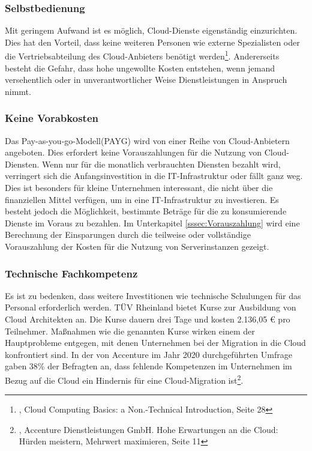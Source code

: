 \subsubsection{Selbstbedienung}
Mit geringem Aufwand ist es möglich, Cloud-Dienste eigenständig einzurichten. Dies hat den Vorteil, dass keine weiteren Personen wie externe Spezialisten oder die Vertriebsabteilung des Cloud-Anbieters  benötigt werden\footnote{\cite{CCB}, Cloud Computing Basics: a Non.-Technical Introduction, Seite 28}.
Andererseits besteht die Gefahr, dass hohe ungewollte Kosten entstehen, wenn jemand versehentlich oder in unverantwortlicher Weise Dienstleistungen in Anspruch nimmt.    

\subsubsection{Keine Vorabkosten}
Das Pay-as-you-go-Modell(PAYG) wird von einer Reihe von Cloud-Anbietern angeboten. Dies erfordert keine Vorauszahlungen für die Nutzung von Cloud-Diensten. Wenn nur für die monatlich verbrauchten Diensten bezahlt wird, verringert sich die Anfangsinvestition in die IT-Infrastruktur oder fällt ganz weg. Dies ist besonders für kleine Unternehmen interessant, die nicht über die finanziellen Mittel verfügen, um in eine IT-Infrastruktur zu investieren. Es besteht jedoch die Möglichkeit, bestimmte Beträge für die zu konsumierende Dienste im Voraus zu bezahlen. Im Unterkapitel \ref{sssec:Vorauszahlung} wird eine Berechnung der Einsparungen durch die teilweise oder vollständige Vorauszahlung der Kosten für die Nutzung von Serverinstanzen gezeigt.  




\subsubsection{Technische Fachkompetenz}
Es ist zu bedenken, dass weitere Investitionen wie technische Schulungen für das Personal erforderlich werden. TÜV Rheinland bietet Kurse zur Ausbildung von Cloud Architekten an. Die Kurse dauern drei Tage und kosten 2.136,05 € pro Teilnehmer. Maßnahmen wie die genannten Kurse wirken einem der Hauptprobleme entgegen, mit denen Unternehmen bei der Migration in die Cloud konfrontiert sind. In der von Accenture im Jahr 2020 durchgeführten Umfrage gaben 38\% der Befragten an, dass fehlende Kompetenzen im Unternehmen im Bezug auf die Cloud ein Hindernis für eine Cloud-Migration ist\footnote{\cite{ACC1}, Accenture Dienstleistungen GmbH. Hohe Erwartungen an die Cloud: Hürden
meistern, Mehrwert maximieren, Seite 11}.


